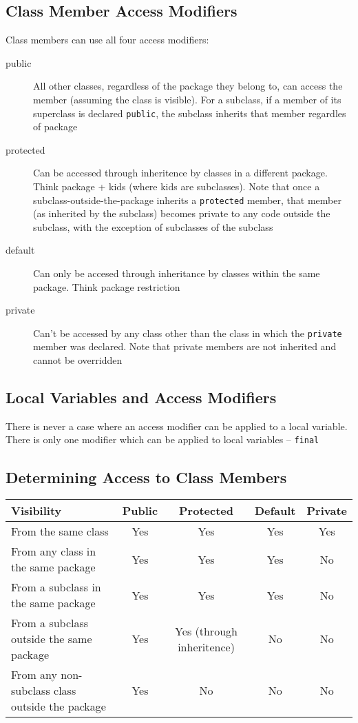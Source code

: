 \subsection{Class Member Access Modifiers}
Class members can use all four access modifiers:
\begin{description}
    \item[public] All other classes, regardless of the package they belong to, 
    can access the member (assuming the class is visible). For a subclass, if a 
    member of its superclass is declared \verb#public#, the subclass inherits 
    that member regardles of package
    \item[protected] Can be accessed through inheritence by classes in a 
    different package. Think package + kids (where kids are subclasses). Note 
    that once a subclass-outside-the-package inherits a \verb#protected# 
    member, that member (as inherited by the subclass) becomes private to any 
    code outside the subclass, with the exception of subclasses of the subclass
    \item[default] Can only be accesed through inheritance by classes within 
    the same package. Think package restriction
    \item[private] Can't be accessed by any class other than the class in which 
    the \verb#private# member was declared. Note that private members are not 
    inherited and cannot be overridden
\end{description}

\subsection{Local Variables and Access Modifiers}
There is never a case where an access modifier can be applied to a local 
variable. There is only one modifier which can be applied to local variables -- 
\verb#final#

\subsection{Determining Access to Class Members}
\begin{center}
\begin{tabular}{lcccc}
    \textbf{Visibility} & \textbf{Public} & \textbf{Protected} & 
    \textbf{Default} & \textbf{Private} \\
    \hline
    From the same class & Yes & Yes & Yes & Yes \\
    \hline
    From any class in the same package & Yes & Yes & Yes & No \\
    \hline
    From a subclass in the same package & Yes & Yes & Yes & No \\
    \hline
    From a subclass outside the same package & Yes & Yes (through inheritence) 
    & No & No \\
    \hline
    From any non-subclass class outside the package & Yes & No & No & No \\
    \hline
\end{tabular}
\end{center}

